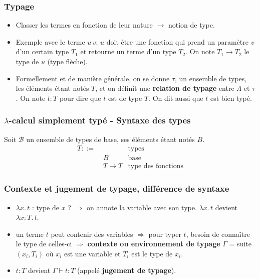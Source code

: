 \documentclass{beamer}
\newcommand{\lambdaExpr}[2]{\lambda #1 . \, #2}
\begin{document}
\begin{frame}
  \frametitle{Typage}
  \begin{itemize}
    \item Classer les termes en fonction de leur nature $\rightarrow$ notion de type.
    \item Exemple avec le terme $u \, v$: $u$ doit être une fonction qui prend un
      paramètre $v$ d'un certain type $T_{1}$ et retourne un terme d'un type
      $T_{2}$. On note $T_{1} \rightarrow T_{2}$ le type de $u$ (type flèche).
    \item Formellement et de manière générale, on se donne $\tau$, un ensemble de types, les éléments
      étant notés $T$, et on définit une \textbf{relation de typage}
      entre $\Lambda$ et $\tau$. On note $t : T$ pour dire que $t$ est de type
      $T$. On dit aussi que $t$ est bien typé.
  \end{itemize}
\end{frame}

\begin{frame}
  \frametitle{$\lambda$-calcul simplement typé - Syntaxe des types}
  Soit $\mathcal{B}$ un ensemble de types de base, ses éléments étant notés
  $B$.
  \begin{align*}
    T ::= & \, & \text{types} \\
          & \; B & \text{base} \\
          & \; T \rightarrow T & \text{type des fonctions}
  \end{align*}
\end{frame}

\begin{frame}
  \frametitle{Contexte et jugement de typage, différence de syntaxe}
  \begin{itemize}
  \item $\lambdaExpr{x}{t}$ : type de $x$ ? $\Rightarrow$ on annote la variable
    avec son type. $\lambdaExpr{x}{t}$ devient $\lambdaExpr{x : T}{t}$.
  \item un terme $t$ peut contenir des variables $\Rightarrow$ pour typer $t$, besoin de
    connaître le type de celles-ci $\Rightarrow$ \textbf{contexte ou
      environnement de
    typage} $\Gamma$ = suite $(x_{i}, T_{i})$ où $x_{i}$ est une
    variable et $T_{i}$ est le type de $x_{i}$.
  \item $t : T$ devient $\Gamma \vdash t : T$ (appelé \textbf{jugement de typage}).

  \end{itemize}
\end{frame}
\end{document}
